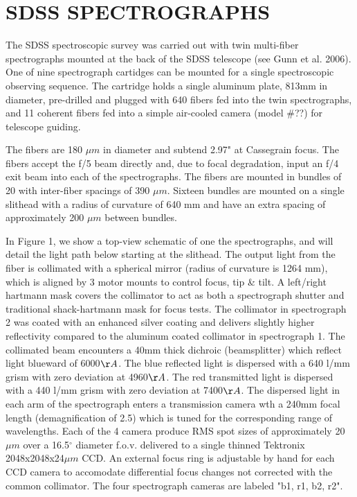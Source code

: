 \documentclass[12pt,preprint]{aastex}
\newcommand{\degree}{^\circ}
\begin{document}
\section{SDSS SPECTROGRAPHS}
\label{sec_spectrographs}

The SDSS spectroscopic survey was carried out with twin multi-fiber 
spectrographs mounted at the back of the SDSS telescope (see Gunn et al.
2006).  One of nine spectrograph cartidges can be mounted for a single
spectroscopic observing sequence.  The cartridge holds a single aluminum
plate, 813mm in diameter, pre-drilled and plugged with 640 fibers 
fed into the twin spectrographs, 
and 11 coherent fibers fed into a simple air-cooled camera (model \#??)
for telescope guiding.

The fibers are 180 $\mu m$ in diameter and subtend 2.97" at Cassegrain focus.
The fibers accept the f/5 beam directly and, due to focal degradation, input
an f/4 exit beam into each of the spectrographs.  The fibers are mounted in
bundles of 20 with inter-fiber spacings of 390 $\mu m$.  Sixteen bundles are
mounted on a single slithead with a radius of curvature of 640 mm and have
an extra spacing of approximately 200 $\mu m$ between bundles.

In Figure 1, we show a top-view schematic of one the spectrographs, and
will detail the light path below starting at the slithead.
The output light from the fiber is collimated with a spherical mirror
(radius of curvature is 1264 mm), which is aligned by 3 motor mounts to
control focus, tip \& tilt.  A left/right hartmann mask 
covers the collimator to act as both a spectrograph shutter and traditional 
shack-hartmann mask for focus tests.  The collimator in spectrograph 2
was coated with an enhanced silver coating and delivers slightly higher
reflectivity compared to the aluminum coated collimator in spectrograph 1.
The collimated beam encounters a 40mm thick dichroic (beamsplitter) which
reflect light blueward of 6000$\AA$.  The blue reflected light is dispersed
with a 640 l/mm grism with zero deviation at 4960$\AA$.  The red transmitted
light is dispersed with a 440 l/mm grism with zero deviation at 7400$\AA$.
The dispersed light in each arm of the spectrograph enters a transmission camera
wth a 240mm focal length (demagnification of 2.5) which is tuned for the 
corresponding range of wavelengths.  Each of the 4 camera produce RMS 
spot sizes of approximately 20$\mu m$ over a 16.5$\degree$ diameter 
f.o.v. delivered to a single thinned Tektronix 2048x2048x24$\mu m$ CCD.
An external focus ring is adjustable by hand for each CCD camera to accomodate
differential focus changes not corrected with the common collimator.
The four spectrograph cameras are labeled "b1, r1, b2, r2".  
\end{document}
